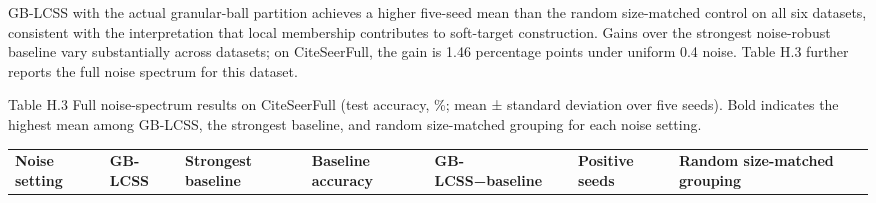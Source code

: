 GB-LCSS with the actual granular-ball partition achieves a higher five-seed mean than the random size-matched control on all six datasets, consistent with the interpretation that local membership contributes to soft-target construction. Gains over the strongest noise-robust baseline vary substantially across datasets; on CiteSeerFull, the gain is 1.46 percentage points under uniform 0.4 noise. Table H.3 further reports the full noise spectrum for this dataset.

Table H.3 Full noise-spectrum results on CiteSeerFull (test accuracy, \%; mean ± standard deviation over five seeds). Bold indicates the highest mean among GB-LCSS, the strongest baseline, and random size-matched grouping for each noise setting.

{\def\LTcaptype{none} %
\begin{longtable}[]{@{}
  >{\raggedright\arraybackslash}p{}
  >{\centering\arraybackslash}p{}
  >{\centering\arraybackslash}p{}
  >{\centering\arraybackslash}p{}
  >{\centering\arraybackslash}p{}
  >{\centering\arraybackslash}p{}
  >{\centering\arraybackslash}p{}@{}}
\toprule\noalign{}
\begin{minipage}[b]{\linewidth}\raggedright
\textbf{Noise setting}
\end{minipage} & \begin{minipage}[b]{\linewidth}\centering
\textbf{GB-LCSS}
\end{minipage} & \begin{minipage}[b]{\linewidth}\centering
\textbf{Strongest baseline}
\end{minipage} & \begin{minipage}[b]{\linewidth}\centering
\textbf{Baseline accuracy}
\end{minipage} & \begin{minipage}[b]{\linewidth}\centering
\textbf{GB-LCSS−baseline}
\end{minipage} & \begin{minipage}[b]{\linewidth}\centering
\textbf{Positive seeds}
\end{minipage} & \begin{minipage}[b]{\linewidth}\centering
\textbf{Random size-matched grouping}
\end{minipage} \\

\end{longtable}}
